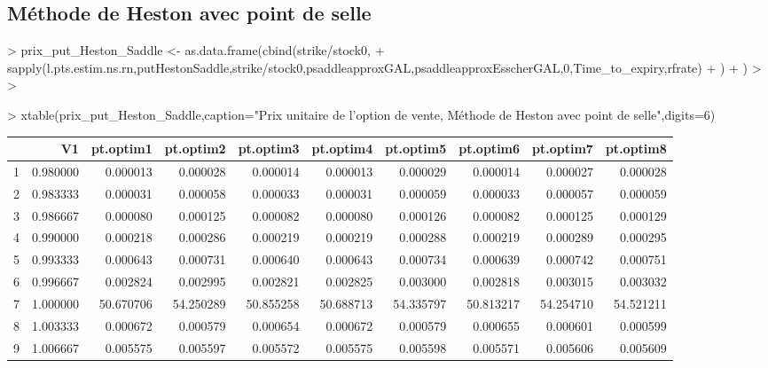 \documentclass[letter]{report}
\begin{document}
\subsection{Méthode de Heston avec point de selle}


\begin{Schunk}
\begin{Sinput}
> 	prix_put_Heston_Saddle <- as.data.frame(cbind(strike/stock0,
+ 					sapply(l.pts.estim.ns.rn,putHestonSaddle,strike/stock0,psaddleapproxGAL,psaddleapproxEsscherGAL,0,Time_to_expiry,rfrate)
+ 	)
+ 	)
> 	
> 	
\end{Sinput}
\end{Schunk}

\begin{Schunk}
\begin{Sinput}
> 	xtable(prix_put_Heston_Saddle,caption="Prix unitaire de l'option de vente, Méthode de Heston avec point de selle",digits=6)
\end{Sinput}
% latex table generated in R 3.0.2 by xtable 1.7-4 package
% Mon Oct 13 12:28:07 2014
\begin{table}[ht]
\centering
\begin{tabular}{rrrrrrrrrr}
  \hline
 & V1 & pt.optim1 & pt.optim2 & pt.optim3 & pt.optim4 & pt.optim5 & pt.optim6 & pt.optim7 & pt.optim8 \\ 
  \hline
1 & 0.980000 & 0.000013 & 0.000028 & 0.000014 & 0.000013 & 0.000029 & 0.000014 & 0.000027 & 0.000028 \\ 
  2 & 0.983333 & 0.000031 & 0.000058 & 0.000033 & 0.000031 & 0.000059 & 0.000033 & 0.000057 & 0.000059 \\ 
  3 & 0.986667 & 0.000080 & 0.000125 & 0.000082 & 0.000080 & 0.000126 & 0.000082 & 0.000125 & 0.000129 \\ 
  4 & 0.990000 & 0.000218 & 0.000286 & 0.000219 & 0.000219 & 0.000288 & 0.000219 & 0.000289 & 0.000295 \\ 
  5 & 0.993333 & 0.000643 & 0.000731 & 0.000640 & 0.000643 & 0.000734 & 0.000639 & 0.000742 & 0.000751 \\ 
  6 & 0.996667 & 0.002824 & 0.002995 & 0.002821 & 0.002825 & 0.003000 & 0.002818 & 0.003015 & 0.003032 \\ 
  7 & 1.000000 & 50.670706 & 54.250289 & 50.855258 & 50.688713 & 54.335797 & 50.813217 & 54.254710 & 54.521211 \\ 
  8 & 1.003333 & 0.000672 & 0.000579 & 0.000654 & 0.000672 & 0.000579 & 0.000655 & 0.000601 & 0.000599 \\ 
  9 & 1.006667 & 0.005575 & 0.005597 & 0.005572 & 0.005575 & 0.005598 & 0.005571 & 0.005606 & 0.005609 \\ 

\end{tabular}
\end{table}
\end{Schunk}
\end{document}
